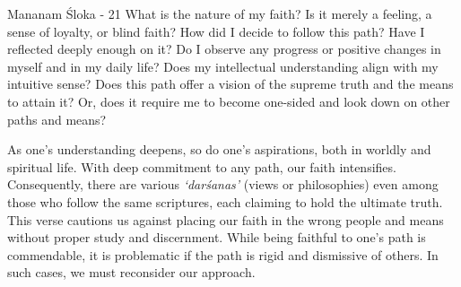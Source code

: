 \begin{mananam}{\mananamfont Mananam Śloka - 21}
\normalfont\mananamtext What is the nature of my faith? Is it merely a feeling, a sense of loyalty, or blind faith? How did I decide to follow this path? Have I reflected deeply enough on it? Do I observe any progress or positive changes in myself and in my daily life?
Does my intellectual understanding align with my intuitive sense? Does this path offer a vision of the supreme truth and the means to attain it? Or, does it require me to become one-sided and look down on other paths and means?
\end{mananam}
\sreflect
\begin{inspiration}{}
\normalfont\mananamtext As one’s understanding deepens, so do one’s aspirations, both in worldly and spiritual life. With deep commitment to any path, our faith intensifies. Consequently, there are various \emph{‘darśanas’} (views or philosophies) even among those who follow the same scriptures, each claiming to hold the ultimate truth. This verse cautions us against placing our faith in the wrong people and means without proper study and discernment. While being faithful to one’s path is commendable, it is problematic if the path is rigid and dismissive of others. In such cases, we must reconsider our approach.
\end{inspiration}
\newpage





